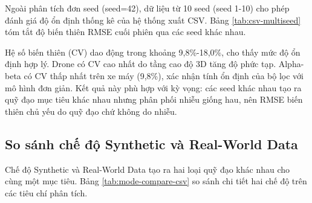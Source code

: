 \hspace{0.5cm} Ngoài phân tích đơn seed (seed=42), dữ liệu từ 10 seed (seed 1-10) cho phép đánh giá độ ổn định thống kê của hệ thống xuất CSV. Bảng \ref{tab:csv-multiseed} tóm tắt độ biến thiên RMSE cuối phiên qua các seed khác nhau.

\begin{table}[H]
\centering
\caption{Biến thiên RMSE cuối phiên qua 10 seed}
\label{tab:csv-multiseed}
\end{table}

Hệ số biến thiên (CV) dao động trong khoảng 9,8\%-18,0\%, cho thấy mức độ ổn định hợp lý. Drone có CV cao nhất do tầng cao độ 3D tăng độ phức tạp. Alpha-beta có CV thấp nhất trên xe máy (9,8\%), xác nhận tính ổn định của bộ lọc với mô hình đơn giản. Kết quả này phù hợp với kỳ vọng: các seed khác nhau tạo ra quỹ đạo mục tiêu khác nhau nhưng phân phối nhiễu giống hau, nên RMSE biến thiên chủ yếu do quỹ đạo chứ không do nhiễu.

\subsection{So sánh chế độ Synthetic và Real-World Data}

\hspace{0.5cm} Chế độ Synthetic và Real-World Data tạo ra hai loại quỹ đạo khác nhau cho cùng một mục tiêu. Bảng \ref{tab:mode-compare-csv} so sánh chi tiết hai chế độ trên các tiêu chí phân tích.

